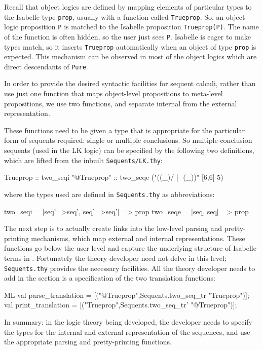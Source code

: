 Recall that object logics are defined by mapping elements of
particular types to the Isabelle type \verb|prop|, usually with a
function called {\tt Trueprop}. So, an object
logic proposition {\tt P} is matched to the Isabelle proposition
{\tt Trueprop(P)}\@.  The name of the function is often hidden, so the
user just sees {\tt P}\@. Isabelle is eager to make types match, so it
inserts {\tt Trueprop} automatically when an object of type {\tt prop}
is expected. This mechanism can be observed in most of the object
logics which are direct descendants of {\tt Pure}.

In order to provide the desired syntactic facilities for sequent
calculi, rather than use just one function that maps object-level
propositions to meta-level propositions, we use two functions, and
separate internal from the external representation. 

These functions need to be given a type that is appropriate for the particular
form of sequents required: single or multiple conclusions.  So
multiple-conclusion sequents (used in the LK logic) can be
specified by the following two definitions, which are lifted from the inbuilt
{\tt Sequents/LK.thy}:
\begin{ttbox}
 Trueprop       :: two_seqi
 "@Trueprop"    :: two_seqe   ("((_)/ |- (_))" [6,6] 5)
\end{ttbox}
%
where the types used are defined in {\tt Sequents.thy} as
abbreviations:
\begin{ttbox}
 two_seqi = [seq'=>seq', seq'=>seq'] => prop
 two_seqe = [seq, seq] => prop
\end{ttbox}

The next step is to actually create links into the low-level parsing
and pretty-printing mechanisms, which map external and internal
representations. These functions go below the user level and capture
the underlying structure of Isabelle terms in \ML{}\@.  Fortunately the
theory developer need not delve in this level; {\tt Sequents.thy}
provides the necessary facilities. All the theory developer needs to
add in the \ML{} section is a specification of the two translation
functions:
\begin{ttbox}
ML
val parse_translation = [("@Trueprop",Sequents.two_seq_tr "Trueprop")];
val print_translation = [("Trueprop",Sequents.two_seq_tr' "@Trueprop")];
\end{ttbox}

In summary: in the logic theory being developed, the developer needs
to specify the types for the internal and external representation of
the sequences, and use the appropriate parsing and pretty-printing
functions. 

